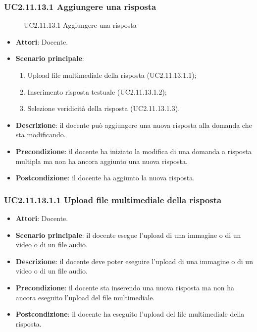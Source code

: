 \subsubsection{UC2.11.13.1 Aggiungere una risposta}
\begin{figure}[H]
\centering
\noindent{}
\caption{UC2.11.13.1 Aggiungere una risposta}
\end{figure}
\begin{itemize}
\item \textbf{Attori}: Docente.
\item \textbf{Scenario principale}:
\begin{enumerate}
\item Upload file multimediale della risposta (UC2.11.13.1.1);
\item Inserimento risposta testuale (UC2.11.13.1.2);
\item Selezione veridicità della risposta (UC2.11.13.1.3).
\end{enumerate}
\item \textbf{Descrizione}: il docente può aggiungere una nuova risposta alla domanda che sta modificando.
\item \textbf{Precondizione}: il docente ha iniziato la modifica di una domanda a risposta multipla ma non ha ancora aggiunto una nuova risposta.
\item \textbf{Postcondizione}: il docente ha aggiunto la nuova risposta.
\end{itemize}
\subsubsection{UC2.11.13.1.1 Upload file multimediale della risposta}
\begin{itemize}
\item \textbf{Attori}: Docente.
\item \textbf{Scenario principale}: il docente esegue l'upload di una immagine o di un video o di un file audio.
\item \textbf{Descrizione}: il docente deve poter eseguire l'upload di una immagine o di un video o di un file audio.
\item \textbf{Precondizione}: il docente sta inserendo una nuova risposta  ma non ha ancora eseguito l'upload del file multimediale.
\item \textbf{Postcondizione}: il docente ha eseguito l'upload del file multimediale della risposta.
\end{itemize}
